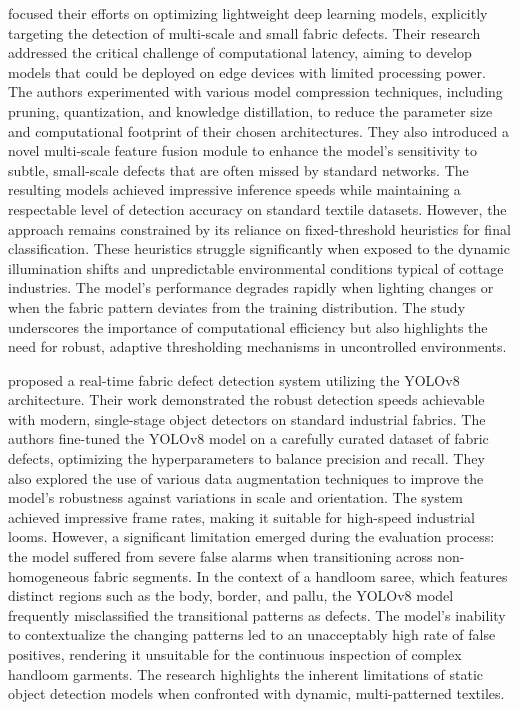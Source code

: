 \documentclass{ieeeaccess}
\begin{document}
\cite{b3} focused their efforts on optimizing lightweight deep learning models, explicitly targeting the detection of multi-scale and small fabric defects. Their research addressed the critical challenge of computational latency, aiming to develop models that could be deployed on edge devices with limited processing power. The authors experimented with various model compression techniques, including pruning, quantization, and knowledge distillation, to reduce the parameter size and computational footprint of their chosen architectures. They also introduced a novel multi-scale feature fusion module to enhance the model's sensitivity to subtle, small-scale defects that are often missed by standard networks. The resulting models achieved impressive inference speeds while maintaining a respectable level of detection accuracy on standard textile datasets. However, the approach remains constrained by its reliance on fixed-threshold heuristics for final classification. These heuristics struggle significantly when exposed to the dynamic illumination shifts and unpredictable environmental conditions typical of cottage industries. The model's performance degrades rapidly when lighting changes or when the fabric pattern deviates from the training distribution. The study underscores the importance of computational efficiency but also highlights the need for robust, adaptive thresholding mechanisms in uncontrolled environments.

\cite{b4} proposed a real-time fabric defect detection system utilizing the YOLOv8 architecture. Their work demonstrated the robust detection speeds achievable with modern, single-stage object detectors on standard industrial fabrics. The authors fine-tuned the YOLOv8 model on a carefully curated dataset of fabric defects, optimizing the hyperparameters to balance precision and recall. They also explored the use of various data augmentation techniques to improve the model's robustness against variations in scale and orientation. The system achieved impressive frame rates, making it suitable for high-speed industrial looms. However, a significant limitation emerged during the evaluation process: the model suffered from severe false alarms when transitioning across non-homogeneous fabric segments. In the context of a handloom saree, which features distinct regions such as the body, border, and pallu, the YOLOv8 model frequently misclassified the transitional patterns as defects. The model's inability to contextualize the changing patterns led to an unacceptably high rate of false positives, rendering it unsuitable for the continuous inspection of complex handloom garments. The research highlights the inherent limitations of static object detection models when confronted with dynamic, multi-patterned textiles.
\end{document}
